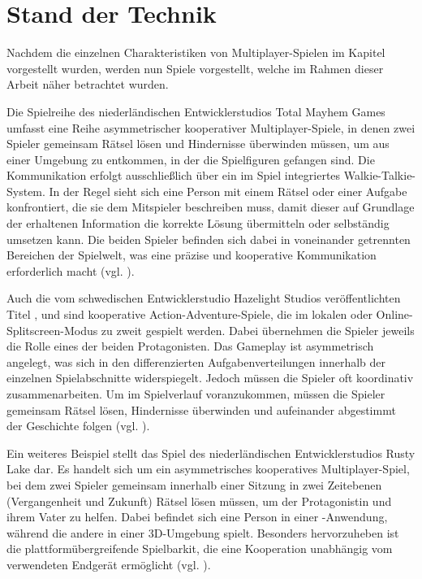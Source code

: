 \chapter{Stand der Technik} \label{sec:sota}
Nachdem die einzelnen Charakteristiken von Multiplayer-Spielen im Kapitel \emph{} vorgestellt wurden, werden nun Spiele vorgestellt, welche im Rahmen dieser Arbeit näher betrachtet wurden.

Die Spielreihe  des niederländischen Entwicklerstudios Total Mayhem Games umfasst eine Reihe asymmetrischer kooperativer Multiplayer-Spiele, in denen zwei Spieler gemeinsam Rätsel lösen und Hindernisse überwinden müssen, um aus einer Umgebung zu entkommen, in der die Spielfiguren gefangen sind. Die Kommunikation erfolgt ausschließlich über ein im Spiel integriertes Walkie-Talkie-System. In der Regel sieht sich eine Person mit einem Rätsel oder einer Aufgabe konfrontiert, die sie dem Mitspieler beschreiben muss, damit dieser auf Grundlage der erhaltenen Information die korrekte Lösung übermitteln oder selbständig umsetzen kann. Die beiden Spieler befinden sich dabei in voneinander getrennten Bereichen der Spielwelt, was eine präzise und kooperative Kommunikation erforderlich macht (vgl. \citealp{total_mayhem_games_we_2017,total_mayhem_games_we_2018}).  

Auch die vom schwedischen Entwicklerstudio Hazelight Studios veröffentlichten Titel ,  und   sind kooperative Action-Adventure-Spiele, die im lokalen oder Online-Splitscreen-Modus zu zweit gespielt werden. Dabei übernehmen die Spieler jeweils die Rolle eines der beiden Protagonisten. Das Gameplay ist asymmetrisch angelegt, was sich in den differenzierten Aufgabenverteilungen innerhalb der einzelnen Spielabschnitte widerspiegelt. Jedoch müssen die Spieler oft koordinativ zusammenarbeiten. Um im Spielverlauf voranzukommen, müssen die Spieler gemeinsam Rätsel lösen, Hindernisse überwinden und aufeinander abgestimmt der Geschichte folgen (vgl. \citealp{hazelight_studios_way_2018,hazelight_studios_it_2021,hazelight_studios_split_2025}).

Ein weiteres Beispiel stellt das Spiel  des niederländischen Entwicklerstudios Rusty Lake dar. Es handelt sich um ein asymmetrisches kooperatives Multiplayer-Spiel, bei dem zwei Spieler gemeinsam innerhalb einer Sitzung in zwei Zeitebenen (Vergangenheit und Zukunft) Rätsel lösen müssen, um der Protagonistin und ihrem Vater zu helfen. Dabei befindet sich eine Person in einer -Anwendung, während die andere in einer \ac{3D}-Umgebung spielt. Besonders hervorzuheben ist die plattformübergreifende Spielbarkit, die eine Kooperation unabhängig vom verwendeten Endgerät ermöglicht (vgl. \citealp{rusty_lake_past_2022}). 

